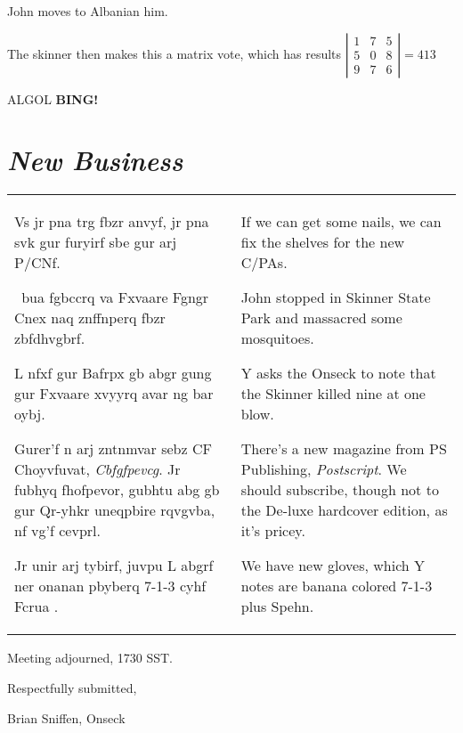 \documentclass[10pt]{article}
\newcommand{\bing}{{\bf BING!} }
\newcommand{\goto}[1]{\bing \vskip 12pt \section*{{\em{#1}}}}
\newcommand{\ps}{ plus Spehn\xspace}
\begin{document}
John moves to Albanian him.

The skinner then makes this a matrix vote, which has results
  $\left|\begin{array}{ccc} 1 & 7 & 5 \\ 5 & 0 & 8 \\ 9 & 7 &
  6\end{array}\right| = 413$

ALGOL
\goto{New Business}

\begin{tabular}{p{.4\hsize}p{.4\hsize}}
Vs jr pna trg fbzr anvyf, jr pna svk gur furyirf sbe gur arj P/CNf.

\verb*. .bua fgbccrq va Fxvaare Fgngr Cnex naq znffnperq fbzr zbfdhvgbrf.

L nfxf gur Bafrpx gb abgr gung gur Fxvaare xvyyrq avar ng bar oybj.

Gurer'f n arj zntnmvar sebz CF Choyvfuvat, \emph{Cbfgfpevcg}.  Jr
fubhyq fhofpevor, gubhtu abg gb gur Qr-yhkr uneqpbire rqvgvba, nf vg'f
cevprl.

Jr unir arj tybirf, juvpu L abgrf ner onanan pbyberq 7-1-3 cyhf Fcrua
.

&

If we can get some nails, we can fix the shelves for the new C/PAs.

John stopped in Skinner State Park and massacred some mosquitoes.

Y asks the Onseck to note that the Skinner killed nine at one blow.

There's a new magazine from PS Publishing, \emph{Postscript}.  We
should subscribe, though not to the De-luxe hardcover edition, as it's
pricey.

We have new gloves, which Y notes are banana colored 7-1-3\ps.
\end{tabular}

\vspace{12pt}

\noindent
Meeting adjourned, 1730 SST.

\vspace{18pt}

\centerline{Respectfully submitted,}
\centerline{Brian Sniffen, Onseck}
\end{document}
